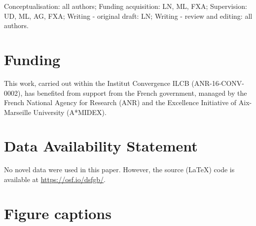 \documentclass[utf8]{template/frontiersSCNS} %
\begin{document}
Conceptualisation: all authors; Funding acquisition: LN, ML, FXA; Supervision: UD, ML, AG, FXA; Writing - original draft: LN; Writing - review and editing: all authors.

\section*{Funding}

This work, carried out within the Institut Convergence ILCB (ANR-16-CONV-0002), has benefited from support from the French government, managed by the French National Agency for Research (ANR) and the Excellence Initiative of Aix-Marseille University (A*MIDEX).





\section*{Data Availability Statement}

No novel data were used in this paper. However, the source (\LaTeX) code is available at \url{https://osf.io/dsfgb/}.




\section*{Figure captions}

\end{document}
